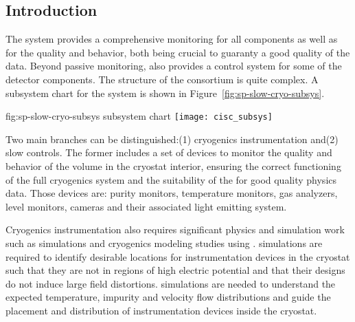 \subsection{Introduction}
\label{sec:fddp-slow-cryo-intro}



The  system provides
a comprehensive monitoring for all  components as well as for the \lar quality and behavior, both being crucial
to guaranty a good quality of the data. Beyond passive monitoring,  also provides a control system for some of the detector components. 
The structure of the  consortium is quite complex. A subsystem chart
for the  system is shown in Figure~\ref{fig:sp-slow-cryo-subsys}. 

\begin{dunefigure}{fig:sp-slow-cryo-subsys}
{ subsystem chart}
\texttt{[image: cisc\_subsys]}
\end{dunefigure}

Two main branches can be distinguished:(1) cryogenics instrumentation and(2) slow controls. The former includes a set of devices 
to monitor the quality and behavior of the \lar volume in the cryostat interior, ensuring the correct functioning of
the full cryogenics system and the suitability of the  for good quality physics data. Those devices are:
purity monitors, temperature monitors, gas analyzers, \lar level monitors, cameras and their associated
light emitting system.

Cryogenics instrumentation also requires significant physics and
simulation work such as \efield simulations and cryogenics modeling
studies using . \efield simulations
are required to identify desirable locations for instrumentation
devices in the cryostat such that they are not in regions of high electric potential and
that their designs do not induce large field distortions. 
simulations are needed to understand the expected temperature,
impurity and velocity flow distributions and guide the placement and
distribution of instrumentation devices inside the cryostat.


